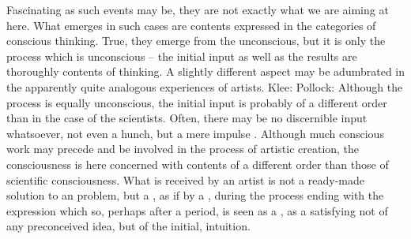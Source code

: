 Fascinating as such events may be, they are not exactly what we are aiming at
here. What emerges in such cases are  contents expressed
 in the categories of conscious thinking.  True, they emerge from
the unconscious, but it is only the process which is unconscious -- the initial
input as well as the results are thoroughly  contents of
 thinking.  A slightly different aspect may be adumbrated in the
apparently quite analogous experiences of artists.  Klee:  Pollock:   Although the process is
equally unconscious, the initial input is probably of a different order than in
the case of the scientists.  Often, there may be no discernible input
whatsoever, not even a hunch, but a mere impulse .
Although much conscious work may precede and be involved in the process of
artistic creation, the consciousness is here concerned with contents of a
different order than those of scientific consciousness.  What is received by an
artist is not a ready-made solution to an  problem, but a
, as if by a , during the process ending with
the  expression which so, perhaps after a 
period, is seen as a , as a satisfying  not of any
preconceived idea, but of the initial,  %
intuition.

